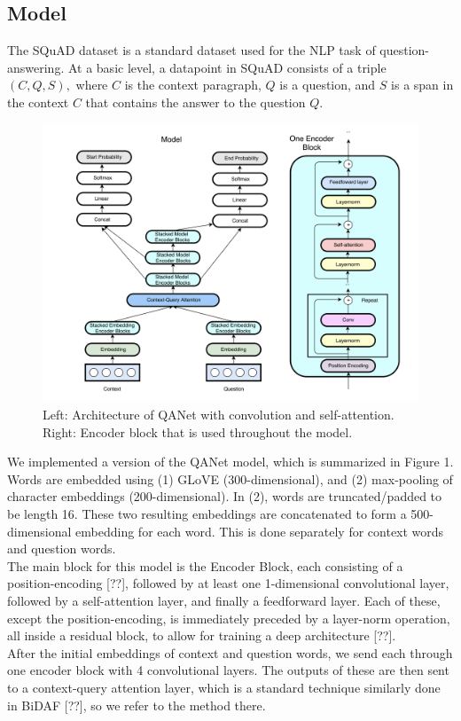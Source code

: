 \documentclass{article}
\begin{document}
\subsection{Model}
The SQuAD dataset is a standard dataset used for the NLP task of question-answering. At a basic level, a datapoint in SQuAD consists of a triple $(C, Q, S),$ where $C$ is the context paragraph, $Q$ is a question, and $S$ is a span in the context $C$ that contains the answer to the question $Q.$
\begin{figure}[h]
\centering
\includegraphics[scale=0.23]{../model_diagram}
\caption{Left: Architecture of QANet with convolution and self-attention. Right: Encoder block that is used throughout the model.}
\end{figure}
We implemented a version of the QANet model, which is summarized in Figure 1. Words are embedded using (1) GLoVE (300-dimensional), and (2) max-pooling of character embeddings (200-dimensional). In (2), words are truncated/padded to be length 16. These two resulting embeddings are concatenated to form a 500-dimensional embedding for each word. This is done separately for context words and question words. \\
The main block for this model is the Encoder Block, each consisting of a position-encoding [??], followed by at least one 1-dimensional convolutional layer, followed by a self-attention layer, and finally a feedforward layer. Each of these, except the position-encoding, is immediately preceded by a layer-norm operation, all inside a residual block, to allow for training a deep architecture [??]. \\
After the initial embeddings of context and question words, we send each through one encoder block with 4 convolutional layers. The outputs of these are then sent to a context-query attention layer, which is a standard technique similarly done in BiDAF [??], so we refer to the method there. \\
\end{document}
